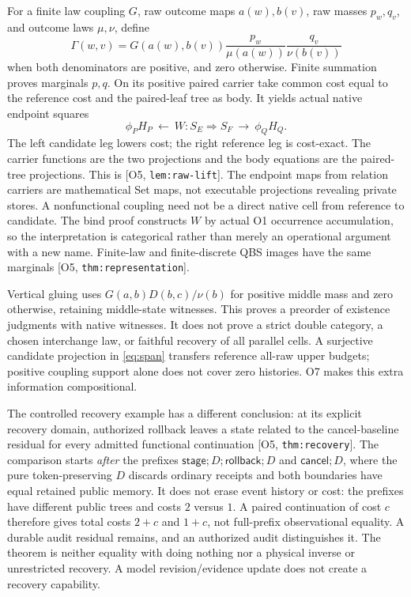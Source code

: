 \documentclass[11pt,a4paper]{article}
\theoremstyle{definition}
\newcommand{\Addr}[2]{\textup{[#1, \texttt{#2}]}}
\begin{document}
For a finite law coupling \(G\), raw outcome maps \(a(w),b(v)\),
raw masses \(p_w,q_v\), and outcome laws \(\mu,\nu\), define
\[
 \Gamma(w,v)=G(a(w),b(v))\frac{p_w}{\mu(a(w))}\frac{q_v}{\nu(b(v))}
\]
when both denominators are positive, and zero otherwise. Finite summation
proves marginals \(p,q\). On its positive paired carrier take common
cost equal to the reference cost and the paired-leaf tree as body.
It yields actual native endpoint squares
\begin{equation}\label{eq:span}
 \phi_PH_P\ \longleftarrow\ W:S_E\Rightarrow S_F
                  \ \longrightarrow\ \phi_QH_Q.
\end{equation}
The left candidate leg lowers cost; the right reference leg is cost-exact.
The carrier functions are the two projections and the body equations are
the paired-tree projections. This is \Addr{O5}{lem:raw-lift}.
The endpoint maps from relation carriers are mathematical Set maps,
not executable projections revealing private stores. A nonfunctional
coupling need not be a direct native cell from reference to candidate.
The bind proof constructs \(W\) by actual O1 occurrence accumulation,
so the interpretation is categorical rather than merely an operational
argument with a new name. Finite-law and finite-discrete QBS images have
the same marginals \Addr{O5}{thm:representation}.

Vertical gluing uses \(G(a,b)D(b,c)/\nu(b)\) for positive middle mass
and zero otherwise, retaining middle-state witnesses. This proves a
preorder of existence judgments with native witnesses. It does not prove
a strict double category, a chosen interchange law, or faithful recovery
of all parallel cells. A surjective candidate projection in
\eqref{eq:span} transfers reference all-raw upper budgets; positive
coupling support alone does not cover zero histories. O7 makes this
extra information compositional.

The controlled recovery example has a different conclusion: at its
explicit recovery domain, authorized rollback leaves a state related to
the cancel-baseline residual for every admitted functional continuation
\Addr{O5}{thm:recovery}. The comparison starts \emph{after} the prefixes
\(\mathsf{stage};D;\mathsf{rollback};D\) and
\(\mathsf{cancel};D\), where the pure token-preserving \(D\) discards
ordinary receipts and both boundaries have equal retained public memory.
It does not erase event history or cost: the prefixes have different
public trees and costs \(2\) versus \(1\). A paired continuation of
cost \(c\) therefore gives total costs \(2+c\) and \(1+c\), not
full-prefix observational equality. A durable audit residual remains,
and an authorized audit distinguishes it. The theorem is neither equality
with doing nothing nor a physical inverse or unrestricted recovery.
A model revision/evidence update does not create a recovery capability.
\end{document}
